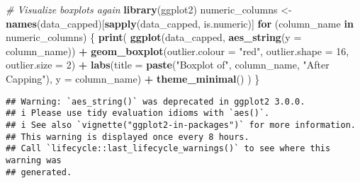 \documentclass[
]{article}
\newenvironment{Shaded}{\begin{snugshade}}{\end{snugshade}}
\newcommand{\AttributeTok}[1]{\textcolor[rgb]{0.13,0.29,0.53}{#1}}
\newcommand{\CommentTok}[1]{\textcolor[rgb]{0.56,0.35,0.01}{\textit{#1}}}
\newcommand{\ControlFlowTok}[1]{\textcolor[rgb]{0.13,0.29,0.53}{\textbf{#1}}}
\newcommand{\DecValTok}[1]{\textcolor[rgb]{0.00,0.00,0.81}{#1}}
\newcommand{\FunctionTok}[1]{\textcolor[rgb]{0.13,0.29,0.53}{\textbf{#1}}}
\newcommand{\NormalTok}[1]{#1}
\newcommand{\OtherTok}[1]{\textcolor[rgb]{0.56,0.35,0.01}{#1}}
\newcommand{\SpecialCharTok}[1]{\textcolor[rgb]{0.81,0.36,0.00}{\textbf{#1}}}
\newcommand{\StringTok}[1]{\textcolor[rgb]{0.31,0.60,0.02}{#1}}
\begin{document}
\begin{Shaded}
\begin{Highlighting}[]
\CommentTok{\# Visualize boxplots again}
\FunctionTok{library}\NormalTok{(ggplot2)}
\NormalTok{numeric\_columns }\OtherTok{\textless{}{-}} \FunctionTok{names}\NormalTok{(data\_capped)[}\FunctionTok{sapply}\NormalTok{(data\_capped, is.numeric)]}
\ControlFlowTok{for}\NormalTok{ (column\_name }\ControlFlowTok{in}\NormalTok{ numeric\_columns) \{}
  \FunctionTok{print}\NormalTok{(}
    \FunctionTok{ggplot}\NormalTok{(data\_capped, }\FunctionTok{aes\_string}\NormalTok{(}\AttributeTok{y =}\NormalTok{ column\_name)) }\SpecialCharTok{+}
      \FunctionTok{geom\_boxplot}\NormalTok{(}\AttributeTok{outlier.colour =} \StringTok{"red"}\NormalTok{, }\AttributeTok{outlier.shape =} \DecValTok{16}\NormalTok{, }\AttributeTok{outlier.size =} \DecValTok{2}\NormalTok{) }\SpecialCharTok{+}
      \FunctionTok{labs}\NormalTok{(}\AttributeTok{title =} \FunctionTok{paste}\NormalTok{(}\StringTok{"Boxplot of"}\NormalTok{, column\_name, }\StringTok{"After Capping"}\NormalTok{), }\AttributeTok{y =}\NormalTok{ column\_name) }\SpecialCharTok{+}
      \FunctionTok{theme\_minimal}\NormalTok{()}
\NormalTok{  )}
\NormalTok{\}}
\end{Highlighting}
\end{Shaded}

\begin{verbatim}
## Warning: `aes_string()` was deprecated in ggplot2 3.0.0.
## i Please use tidy evaluation idioms with `aes()`.
## i See also `vignette("ggplot2-in-packages")` for more information.
## This warning is displayed once every 8 hours.
## Call `lifecycle::last_lifecycle_warnings()` to see where this warning was
## generated.
\end{verbatim}
\end{document}

